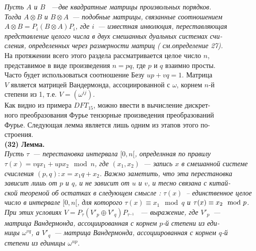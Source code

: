 \documentclass{mai_book}
\begin{document}
{				\smallskip
			\indent \textit{Пусть $A$ и $B$ ~---две квадратные матрицы произвольных порядков.\\Тогда $A\otimes B$ и $B\otimes A$~--- подобные матрицы, связанные соотношением}
			\newpage
{}
\noindent \textit{ $A\otimes B = P_i(B\otimes A)P_i$, где $i$~--- известная инволюция, переставляющая \\ представление целого числа в двух смешанных дуальных системах счи-\\сления, определенных через размерности матриц ( см.определение 27). } \\ 
\indent На протяжении всего этого раздела рассматривается целое число $n$, \\ представимое в виде произведения $ n = pq$, где $p$ и $q$ взаимно просты.\\ Часто будет использоваться соотношение Безу $up + vq = 1$. Матрица \\ $V$ является матрицей Вандермонда, ассоциированной с $\omega$, корнем $n$-й \\ степени из 1, т.е. $V = (\omega^{ij})$.\\
\indent Как видно из примера $DFT_{15}$, можно ввести в вычисление дискрет-\\ного преобразования Фурье тензорные произведения преобразований \\ Фурье. Следующая лемма является лишь одним из этапов этого по-\\строения. \\ 

\noindent\textbf{ (32) Лемма.}\\
\indent \textit{Пусть $\tau$~--- перестановка интервала $[0, n[$, определнная по правилу \\ $\tau(x) = vqx_1 + upx_2 \mod n$, где $(x_1,x_2)$~--- запись $x$ в смешанной системе \\ счисления $(p, q): x = x_1q+x_2$. Важно заметить, что эта перестановка зависит лишь от $p$ и $q$, и не зависит от $u$ и $v$, и тесно связана с китай-\\ской теоремой об остатках в следующем смысле : $\tau(x)$~-- единственное целое число в интервале  $[0, n[$, для которого $\tau(x)\equiv x_1\mod q$ и $\tau(x)  \equiv\\ x_2\mod p$.} \\
\indent \textit{При этих условиях $V = P_\tau(V'_p \oplus V'_q)P_{\tau^{-1}}$ ~--- выражение, где $V'_p$~---\\матрица Вандермонда, ассоциированная с корнем $p$-й степени из еди-\\ницы $\omega ^{vq}$, а $V'_q$~--- матрица Вандермонда, ассоциированная с корнем  $q$-й\\ степени из единицы $\omega ^{up}$}.\\

}
\end{document}
